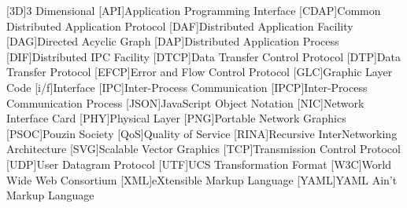 \begin{acronym}[CDAP]
    [3D]{3 Dimensional}
    [API]{Application Programming Interface}
    [CDAP]{Common Distributed Application Protocol}
    [DAF]{Distributed Application Facility}
    [DAG]{Directed Acyclic Graph}
    [DAP]{Distributed Application Process}
    [DIF]{Distributed IPC Facility}
    [DTCP]{Data Transfer Control Protocol}
    [DTP]{Data Transfer Protocol}
    [EFCP]{Error and Flow Control Protocol}
    [GLC]{Graphic Layer Code}
    [i/f]{Interface}
    [IPC]{Inter-Process Communication}
    [IPCP]{Inter-Process Communication Process}
    [JSON]{JavaScript Object Notation}
    [NIC]{Network Interface Card}
    [PHY]{Physical Layer}
    [PNG]{Portable Network Graphics}
    [PSOC]{Pouzin Society}
    [QoS]{Quality of Service}
    [RINA]{Recursive InterNetworking Architecture}
    [SVG]{Scalable Vector Graphics}
    [TCP]{Transmission Control Protocol}
    [UDP]{User Datagram Protocol}
    [UTF]{UCS Transformation Format}
    [W3C]{World Wide Web Consortium}
    [XML]{eXtensible Markup Language}
    [YAML]{YAML Ain't Markup Language}
\end{acronym}

